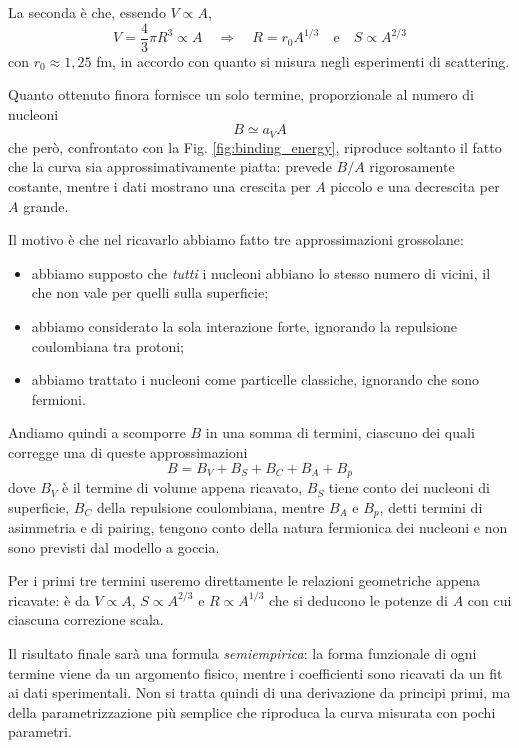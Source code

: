 La seconda è che, essendo $V \propto A$,
%
\begin{equation}
    V = \frac{4}{3} \pi R^3 \propto A \quad \Longrightarrow \quad R = r_0 A^{1/3} \quad \text{e} \quad S \propto A^{2/3}
\end{equation}
con $r_0 \approx 1,25$ fm, in accordo con quanto si misura negli esperimenti di scattering. 

Quanto ottenuto finora fornisce un solo termine, proporzionale al numero di nucleoni
%
\begin{equation}
    B \simeq a_V A
\end{equation}
che però, confrontato con la Fig. \ref{fig:binding_energy}, riproduce soltanto il fatto che la curva sia approssimativamente piatta: prevede $B/A$ rigorosamente costante, mentre i dati mostrano una crescita per $A$ piccolo e una decrescita per $A$ grande. 

Il motivo è che nel ricavarlo abbiamo fatto tre approssimazioni grossolane:
\begin{itemize}
    \item abbiamo supposto che \emph{tutti} i nucleoni abbiano lo stesso numero di vicini, il che non vale per quelli sulla superficie;
    \item abbiamo considerato la sola interazione forte, ignorando la repulsione coulombiana tra protoni;
    \item abbiamo trattato i nucleoni come particelle classiche, ignorando che sono fermioni.
\end{itemize}

Andiamo quindi a scomporre $B$ in una somma di termini, ciascuno dei quali corregge una di queste approssimazioni
%
\begin{equation}
    B = B_V + B_S + B_C + B_A + B_p
\end{equation}
dove $B_V$ è il termine di volume appena ricavato, $B_S$ tiene conto dei nucleoni di superficie, $B_C$ della repulsione coulombiana, mentre $B_A$ e $B_p$, detti termini di asimmetria e di pairing, tengono conto della natura fermionica dei nucleoni e non sono previsti dal modello a goccia. 

Per i primi tre termini useremo direttamente le relazioni geometriche appena ricavate: è da $V \propto A$, $S \propto A^{2/3}$ e $R \propto A^{1/3}$ che si deducono le potenze di $A$ con cui ciascuna correzione scala. 

Il risultato finale sarà una formula \emph{semiempirica}: la forma funzionale di ogni termine viene da un argomento fisico, mentre i coefficienti sono ricavati da un fit ai dati sperimentali. Non si tratta quindi di una derivazione da principi primi, ma della parametrizzazione più semplice che riproduca la curva misurata con pochi parametri.

